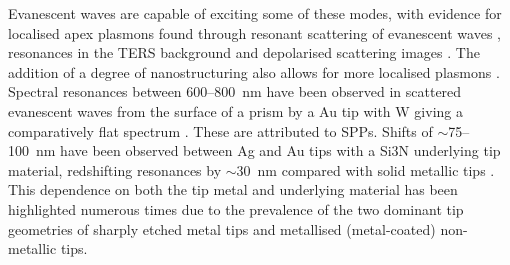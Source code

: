 \documentclass{article}
\begin{document}
Evanescent waves are capable of exciting some of these modes, with evidence for localised apex plasmons found through resonant scattering of evanescent waves \cite{neacsu2005, mehtani2006, barrios2009}, resonances in the TERS background \cite{pettinger2007, pettinger2009} and depolarised scattering images \cite{mino2014}. The addition of a degree of nanostructuring also allows for more localised plasmons \cite{hayazawa2001, bailo2008, hayazawa2012, mino2014}.
Spectral resonances between 600--\SI{800}{nm} have been observed in scattered evanescent waves from the surface of a prism by a Au tip with W giving a comparatively flat spectrum \cite{neacsu2005}. These are attributed to SPPs. Shifts of $\sim$75--\SI{100}{nm} have been observed between Ag and Au tips with a Si\subs3N underlying tip material, redshifting resonances by $\sim$\SI{30}{nm} compared with solid metallic tips \cite{mehtani2006, barrios2009}. This dependence on both the tip metal and underlying material has been highlighted numerous times due to the prevalence of the two dominant tip geometries of sharply etched metal tips and metallised (metal-coated) non-metallic tips.
\end{document}
